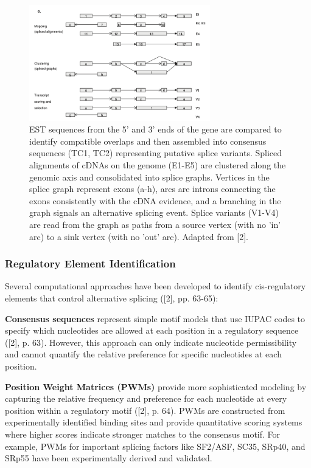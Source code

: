 \documentclass[12pt,a4paper]{article}
\begin{document}
\begin{figure}[H]
\centering
\includegraphics[width=0.7\textwidth]{splice_graph_figure_2e_florea.png}
\caption{EST sequences from the 5' and 3' ends of the gene are compared to identify compatible overlaps and then assembled into consensus sequences (TC1, TC2) representing putative splice variants. Spliced alignments of cDNAs on the genome (E1-E5) are clustered along the genomic axis and consolidated into splice graphs. Vertices in the splice graph represent exons (a-h), arcs are introns connecting the exons consistently with the cDNA evidence, and a branching in the graph signals an alternative splicing event. Splice variants (V1-V4) are read from the graph as paths from a source vertex (with no 'in' arc) to a sink vertex (with no 'out' arc). Adapted from [2].}
\label{fig:splice_graph}
\end{figure}

\subsubsection{Regulatory Element Identification}

Several computational approaches have been developed to identify cis-regulatory elements that control alternative splicing ([2], pp. 63-65):

\textbf{Consensus sequences} represent simple motif models that use IUPAC codes to specify which nucleotides are allowed at each position in a regulatory sequence ([2], p. 63). However, this approach can only indicate nucleotide permissibility and cannot quantify the relative preference for specific nucleotides at each position.

\textbf{Position Weight Matrices (PWMs)} provide more sophisticated modeling by capturing the relative frequency and preference for each nucleotide at every position within a regulatory motif ([2], p. 64). PWMs are constructed from experimentally identified binding sites and provide quantitative scoring systems where higher scores indicate stronger matches to the consensus motif. For example, PWMs for important splicing factors like SF2/ASF, SC35, SRp40, and SRp55 have been experimentally derived and validated.
\end{document}
